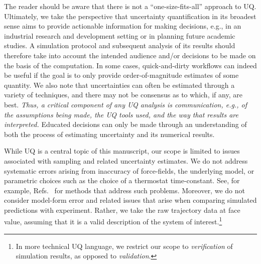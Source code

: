 The reader should be aware that there is not a ``one-size-fits-all'' approach to UQ.  Ultimately, we take the perspective that uncertainty quantification in its broadest sense aims to provide actionable information for making decisions, e.g., in an industrial research and development setting or in planning future academic studies.  A simulation protocol and subsequent analysis of its results should therefore take into account the intended audience and/or decisions to be made on the basis of the computation.  In some cases, quick-and-dirty workflows can indeed be useful if the goal is to only provide order-of-magnitude estimates of some quantity.  We also note that uncertainties can often be estimated through a variety of techniques, and there may not be consensus as to which, if any, are best.  {\it Thus, a critical component of any UQ analysis is communication, e.g., of the assumptions being made, the UQ tools used, and the way that results are interpreted.}  Educated decisions can only be made through an understanding of both the process of estimating uncertainty and its numerical results.

While UQ is a central topic of this manuscript, our scope is limited to issues associated with sampling and related uncertainty estimates.  We do not address systematic errors arising from inaccuracy of force-fields, the underlying model, or parametric choices such as the choice of a thermostat time-constant.  See, for example, Refs.~\cite{Leimkuhler,Rizzi2,Rizzi3,Rizzi4} for methods that address such problems.  Moreover, we do not consider model-form error and related issues that arise when comparing simulated predictions with experiment.  Rather, we take the raw trajectory data at face value, assuming that it is a valid description of the system of interest.\footnote{In more technical UQ language, we restrict our scope to {\it verification} of simulation results, as opposed to {\it validation}.}

